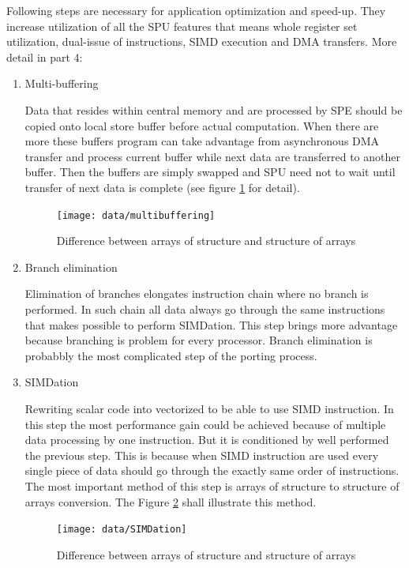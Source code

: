 Following steps are necessary for application optimization and speed-up.
They increase utilization of all the SPU features that means whole register set utilization, dual-issue of instructions, SIMD execution and DMA transfers.
More detail in \cite{writingPerfApps} part 4:
\begin{enumerate}
\item{Multi-buffering}
\par
Data that resides within central memory and are processed by SPE should be copied onto local store buffer before actual computation.
When there are more these buffers program can take advantage from asynchronous DMA transfer and process current buffer while next data are transferred to another buffer.
Then the buffers are simply swapped and SPU need not to wait until transfer of next data is complete (see figure \ref{fg:multibuffering} for detail).

\begin{figure}
    \centering
    \texttt{[image: data/multibuffering]}
    \caption[Multi-buffering]{Difference between arrays of structure and structure of arrays}
    \label{fg:multibuffering}
\end{figure}

\item{Branch elimination}
\par
Elimination of branches elongates instruction chain where no branch is performed.
In such chain all data always go through the same instructions that makes possible to perform SIMDation.
This step brings more advantage because branching is problem for every processor.
Branch elimination is probabbly the most complicated step of the porting process.

\item{SIMDation}
\par
Rewriting scalar code into vectorized to be able to use SIMD instruction.
In this step the most performance gain could be achieved because of multiple data processing by one instruction.
But it is conditioned by well performed the previous step.
This is because when SIMD instruction are used every single piece of data should go through the exactly same order of instructions.
The most important method of this step is arrays of structure to structure of arrays conversion.
The Figure \ref{fg:simdation} shall illustrate this method.

\begin{figure}
    \centering
    \texttt{[image: data/SIMDation]}
    \caption[SIMDation]{Difference between arrays of structure and structure of arrays}
    \label{fg:simdation}
\end{figure}


\end{enumerate}
